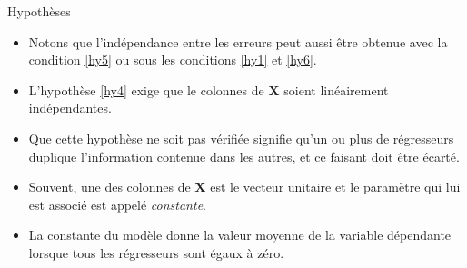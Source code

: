 \begin{frame}[allowframebreaks]{Hypothèses}
\begin{itemize}
\item Notons que l'indépendance entre les erreurs peut aussi être obtenue avec la condition \ref{hy5} ou sous les  conditions \ref{hy1} et \ref{hy6}.\\
\item L'hypothèse \ref{hy4} exige que le colonnes de $\mathbf{X}$ soient linéairement indépendantes. 
\item Que cette hypothèse ne soit pas vérifiée signifie qu'un ou plus de régresseurs duplique l'information contenue dans les autres, et ce faisant doit être écarté.
\item Souvent, une des colonnes de $\mathbf{X}$ est le vecteur unitaire et le paramètre qui lui est associé est appelé \emph{constante}. 
\item La constante du modèle donne la valeur moyenne de la variable dépendante lorsque tous les régresseurs sont égaux à zéro.
\end{itemize}
\end{frame}

